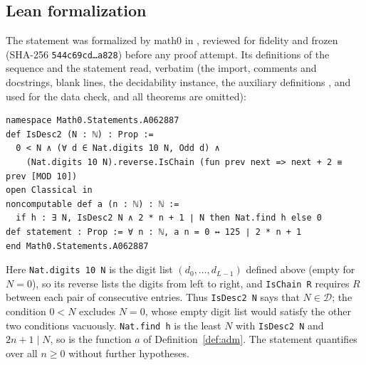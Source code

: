 \documentclass[11pt]{amsart}
\theoremstyle{plain}
\theoremstyle{definition}
\newcommand{\cD}{\mathcal{D}}
\begin{document}
\subsection*{Lean formalization}
The statement was formalized by math0 in , reviewed for fidelity and frozen (SHA-256 \texttt{544c69cd\ldots a828}) before any proof attempt. Its definitions of the sequence and the statement read, verbatim (the import, comments and docstrings, blank lines, the decidability instance, the auxiliary definitions ,  and  used for the data check, and all theorems are omitted):
\begin{lstlisting}
namespace Math0.Statements.A062887
def IsDesc2 (N : ℕ) : Prop :=
  0 < N ∧ (∀ d ∈ Nat.digits 10 N, Odd d) ∧
    (Nat.digits 10 N).reverse.IsChain (fun prev next => next + 2 ≡ prev [MOD 10])
open Classical in
noncomputable def a (n : ℕ) : ℕ :=
  if h : ∃ N, IsDesc2 N ∧ 2 * n + 1 ∣ N then Nat.find h else 0
def statement : Prop := ∀ n : ℕ, a n = 0 ↔ 125 ∣ 2 * n + 1
end Math0.Statements.A062887
\end{lstlisting}
Here \texttt{Nat.digits 10 N} is the digit list $(d_0,\dots,d_{L-1})$ defined above (empty for $N=0$), so its reverse lists the digits from left to right, and \texttt{IsChain R} requires $R$ between each pair of consecutive entries. Thus \texttt{IsDesc2 N} says that $N\in\cD$; the condition $0<N$ excludes $N=0$, whose empty digit list would satisfy the other two conditions vacuously. \texttt{Nat.find h} is the least $N$ with \texttt{IsDesc2 N} and $2n+1\mid N$, so  is the function $a$ of Definition~\ref{def:adm}. The statement quantifies over all $n\ge0$ without further hypotheses.
\end{document}
